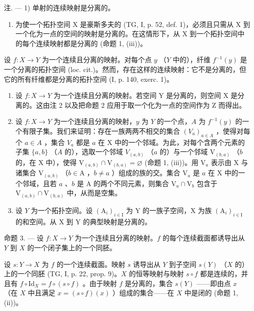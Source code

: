 注. --- 1) 单射的连续映射是分离的。

\begin{enumerate}
\def\labelenumi{\arabic{enumi})}
\setcounter{enumi}{1}
\tightlist
\item
  为使一个拓扑空间 X 是豪斯多夫的 (TG, I, p. 52, def. 1)，必须且只需从 X 到一个化为一点的空间的映射是分离的。在这情形下，从 X 到一个拓扑空间中的每个连续映射都是分离的 (命题 1, (iii))。
\end{enumerate}

设 \(f\colon X \to Y\) 为一个连续且分离的映射。对每个点 \(y\) （\(Y\) 中的），纤维 \(f^{-1}(y)\) 是一个分离的拓扑空间 (loc. cit.)。然而，存在这样的连续映射：它不是分离的，但它的所有纤维都是分离的拓扑空间 (I, p. 140, exerc. 1)。

\begin{enumerate}
\def\labelenumi{\arabic{enumi})}
\setcounter{enumi}{2}
\item
  设 \(f \colon X \to Y\) 为一个连续且分离的映射。若空间 Y 是分离的，则空间 X 是分离的。这由注 2 以及把命题 2 应用于取一个化为一点的空间作为 Z 而得出。
\item
  设 \(f \colon X \to Y\) 为一个连续且分离的映射，\(y\) 为 \(Y\) 的一个点，\(A\) 为 \(f^{-1}(y)\) 的一个有限子集。我们来证明：存在一族两两不相交的集合 \((V_a)_{a \in A}\) ，使得对每个 \(a \in A\) ，集合 \(V_a\) 都是 \(a\) 在 X 中的一个邻域。为此，对每个含两个元素的子集 \(\{a,b\}\) （\(A\) 的），选取一个邻域 \(V_{(a,b)}\) （\(a\) 的）与一个邻域 \(\mathrm{V}_{(b,a)}\) （\(b\) 的，在 X 中），使得 \(\mathrm{V}_{(a,b)} \cap \mathrm{V}_{(b,a)} = \varnothing\) (命题 1, (iii))。用 \(\mathrm{V}_a\) 表示由 X 与诸集合 \(\mathrm{V}_{(a,b)}\) （\(b \in \mathrm{A}\) ，\(b \neq a\) ）组成的族的交。集合 \(\mathrm{V}_a\) 是 \(a\) 在 X 中的一个邻域，且若 \(a\) 、\(b\) 是 A 的两个不同元素，则集合 \(\mathrm{V}_a \cap \mathrm{V}_b\) 包含于 \(\mathrm{V}_{(a,b)} \cap \mathrm{V}_{(b,a)}\) 中，从而是空集。
\item
  设 \(Y\) 为一个拓扑空间。设 \((\mathrm{A}_{i})_{i\in\mathrm{I}}\) 为 Y 的一族子空间，X 为族 \((\mathrm{A}_{i})_{i\in\mathrm{I}}\) 的和空间。从 X 到 Y 的典型映射是分离的。
\end{enumerate}

命题 3. --- 设 \(f\colon X \to Y\) 为一个连续且分离的映射。\(f\) 的每个连续截面都诱导出从 \(Y\) 到 \(X\) 的一个闭子集上的一个同胚。

设 \(s\colon Y \to X\) 为 \(f\) 的一个连续截面。映射 \(s\) 诱导出从 \(Y\) 到子空间 \(s(Y)\) （\(X\) 的）上的一个同胚 (TG, I, p. 22, prop. 9)。\(X\) 的恒等映射与映射 \(s \circ f\) 都是连续的，并且有 \(f \circ \mathrm {Id}_{X} = f \circ (s \circ f)\) 。由于映射 \(f\) 是分离的，集合 \(s(Y)\) ——即由点 \(x\) （在 \(X\) 中且满足 \(x = (s \circ f)(x)\) ）组成的集合——在 \(X\) 中是闭的 (命题 1, (ii))。

